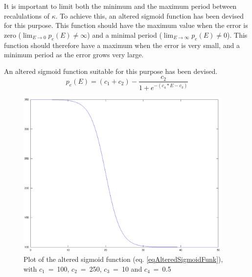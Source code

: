 		It is important to limit both the minimum and the maximum period between recalulations of $\kappa$.
		To achieve this, an altered sigmoid function has been devised for this purpose.
		This function should have the maximum value when the error is zero ($\lim_{E \to 0} p_e(E) \neq \infty$) and a minimal period ($\lim_{E\to\infty} p_e(E) \neq 0$).
		This function should therefore have a maximum when the error is very small, and a minimum period as the error grows very large. 

		An altered sigmoid function suitable for this purpose has been devised.
		\begin{equation}
			\label{eqAlteredSigmoidFunk}
			p_e(E) = (c_1+c_2) - \frac{c_2}{1+e^{-(c_4*E-c_3)}}
		\end{equation}


		\begin{figure}[bht!]
			\begin{center}
				\includegraphics[width=0.95\textwidth]{sigmaPlot.eps}
			\end{center}
			\caption{Plot of the altered sigmoid function (eq. \ref{eqAlteredSigmoidFunk}), with \mbox{$c_1$ = 100}, \mbox{$c_2$ = 250}, \mbox{$c_3$ = 10} and \mbox{$c_4$ = 0.5} }
			\label{figAlteredSigmoidFunction}
		\end{figure}
	
